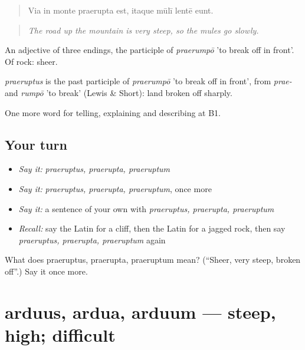 \begin{quote}
Via in monte praerupta est, itaque mūlī lentē eunt.
\end{quote}

\begin{quote}
\emph{The road up the mountain is very steep, so the mules go slowly.}
\end{quote}

An adjective of three endings, the participle of \emph{praerumpō} 'to break off in front'. Of rock: sheer.

\begin{cousinweb}
\emph{praeruptus} is the past participle of \emph{praerumpō} 'to break off in front', from \emph{prae-} and \emph{rumpō} 'to break' (Lewis \& Short): land broken off sharply.
\end{cousinweb}

\begin{grammarlens}[title={What you've built}]
One more word for telling, explaining and describing at B1.
\end{grammarlens}

\subsection*{Your turn}
\begin{itemize}
\raggedright
  \item \emph{Say it:} \emph{praeruptus, praerupta, praeruptum}
  \item \emph{Say it:} \emph{praeruptus, praerupta, praeruptum}, once more
  \item \emph{Say it:} a sentence of your own with \emph{praeruptus, praerupta, praeruptum}
  \item \emph{Recall:} say the Latin for a cliff, then the Latin for a jagged rock, then say \emph{praeruptus, praerupta, praeruptum} again
\end{itemize}

\begin{tcolorbox}[breakable,colback=teal!4,colframe=teal!35!black,title={Before you move on}]
What does praeruptus, praerupta, praeruptum mean? (\textquotedblleft{}Sheer, very steep, broken off\textquotedblright{}.) Say it once more.
\end{tcolorbox}
\section[arduus, ardua, arduum]{arduus, ardua, arduum — steep, high; difficult}

